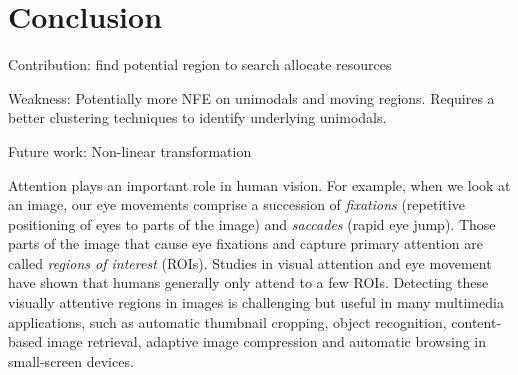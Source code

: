 \chapter{Conclusion}
\label{chapter:conclusion}


Contribution:
find potential region to search
allocate resources

Weakness:
Potentially more NFE on unimodals and moving regions.
Requires a better clustering techniques to identify underlying unimodals.


Future work:
Non-linear transformation



Attention plays an important role in human vision. For example, when
we look at an image, our eye movements comprise a succession of {\em
fixations} (repetitive positioning of eyes to parts of the image)
and {\em saccades} (rapid eye jump). Those parts of the image that
cause eye fixations and capture primary attention are called {\em
regions of interest} (ROIs). Studies in visual attention and eye
movement have shown that humans generally only attend to a few ROIs.
Detecting these visually attentive regions in images is challenging
but useful in many multimedia applications, such as automatic
thumbnail cropping, object recognition, content-based image
retrieval, adaptive image compression and automatic browsing in
small-screen devices.

